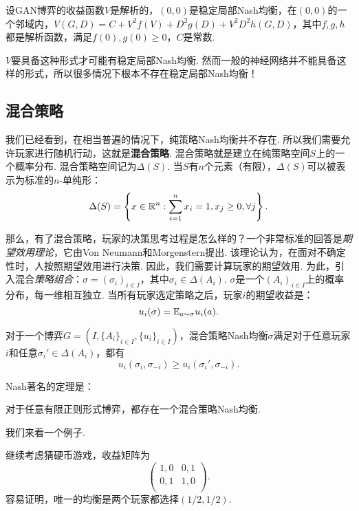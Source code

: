 \begin{theorem}
设GAN博弈的收益函数$V$是解析的，$(0,0)$是稳定局部Nash均衡，在$(0,0)$的一个邻域内，$V(G,D)=C+V^2f(V)+D^2g(D)+V^2D^2h(G,D)$，其中$f,g,h$都是解析函数，满足$f(0),g(0)\geq0 $，$C$是常数.
\end{theorem}

$V$要具备这种形式才可能有稳定局部Nash均衡. 然而一般的神经网络并不能具备这样的形式，所以很多情况下根本不存在稳定局部Nash均衡！

\subsection{混合策略}
我们已经看到，在相当普遍的情况下，纯策略Nash均衡并不存在. 所以我们需要允许玩家进行随机行动，这就是\textbf{混合策略}. 混合策略就是建立在纯策略空间$S$上的一个概率分布. 混合策略空间记为$\Delta(S)$. 当$S$有$n$个元素（有限），$\Delta(S)$可以被表示为标准的$n$-单纯形：
    \[\Delta(S)=\left\{x\in\mathbb{R}^n:\sum_{i=1}^n x_i=1,x_j\geq 0,\forall j\right\}.\]

那么，有了混合策略，玩家的决策思考过程是怎么样的？一个非常标准的回答是\emph{期望效用理论}，它由Von Neumann和Morgenstern提出. 该理论认为，在面对不确定性时，人按照期望效用进行决策. 因此，我们需要计算玩家的期望效用. 为此，引入混合\emph{策略组合}：$\sigma=(\sigma_i)_{i\in I}$，其中$\sigma_i\in\Delta(A_i)$. $\sigma$是一个$(A_i)_{i\in I}$上的概率分布，每一维相互独立. 当所有玩家选定策略之后，玩家$i$的期望收益是：
    \[u_i(\sigma)=\mathbb{E}_{a\sim\sigma} u_i(a).\]


\begin{definition}[Nash均衡]
对于一个博弈$G=(I,\{A_i\}_{i\in I},\{u_i\}_{i\in I})$，混合策略Nash均衡$\sigma$满足对于任意玩家$i$和任意$\sigma_i'\in \Delta(A_i)$，都有
\[u_i(\sigma_i,\sigma_{-i})\geq u_i(\sigma_i',\sigma_{-i}).\]
\end{definition}
Nash著名的定理是：
\begin{theorem}[Nash均衡存在性定理]
对于任意有限正则形式博弈，都存在一个混合策略Nash均衡.
\end{theorem}

我们来看一个例子. 
\begin{example}
继续考虑猜硬币游戏，收益矩阵为
\[
\begin{pmatrix}
1,0&0,1\\
0,1&1,0\\
\end{pmatrix}.
\]
容易证明，唯一的均衡是两个玩家都选择$(1/2,1/2)$.
\end{example}

